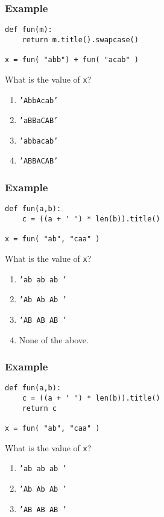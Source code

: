 \documentclass[11pt]{beamer}
\begin{document}
\begin{frame}[fragile]
  \frametitle{Example}
  \Enlarge

  \begin{Verbatim}[commandchars=\\\{\},commentchar=\%]
def fun(m):
    return m.title().swapcase()

x = fun( "abb") + fun( "acab" )
  \end{Verbatim}
  What is the value of \texttt{x}?
  \begin{enumerate}[label=\Alph*]
  \item  \texttt{'AbbAcab'}
  \item  \texttt{'aBBaCAB'} %
  \item  \texttt{'abbacab'}
  \item  \texttt{'ABBACAB'}
  \end{enumerate}
\end{frame}

\begin{frame}[fragile]
  \frametitle{Example}
  \Enlarge

  \begin{Verbatim}[commandchars=\\\{\},commentchar=\%]
def fun(a,b):
    c = ((a + ' ') * len(b)).title()

x = fun( "ab", "caa" )
  \end{Verbatim}
  What is the value of \texttt{x}?
  \begin{enumerate}[label=\Alph*]
  \item  \texttt{'ab ab ab '}
  \item  \texttt{'Ab Ab Ab '}
  \item  \texttt{'AB AB AB '}
  \item  None of the above.   %
  \end{enumerate}
\end{frame}

\begin{frame}[fragile]
  \frametitle{Example}
  \Enlarge

  \begin{Verbatim}[commandchars=\\\{\},commentchar=\%]
def fun(a,b):
    c = ((a + ' ') * len(b)).title()
    return c

x = fun( "ab", "caa" )
  \end{Verbatim}
  What is the value of \texttt{x}?
  \begin{enumerate}[label=\Alph*]
  \item  \texttt{'ab ab ab '}
  \item  \texttt{'Ab Ab Ab '} %
  \item  \texttt{'AB AB AB '}
  \end{enumerate}
\end{frame}
\end{document}
